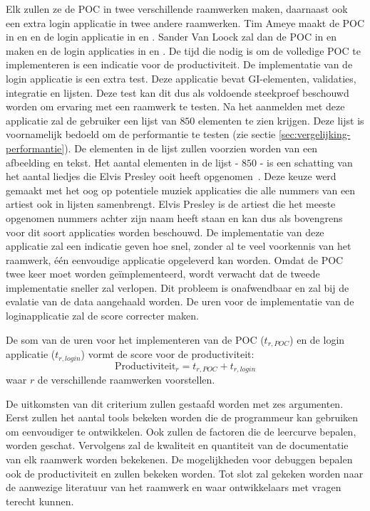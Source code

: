 Elk zullen ze de POC in twee verschillende raamwerken maken,  daarnaast ook een extra login applicatie in twee andere raamwerken.
Tim Ameye maakt de POC in \jqm{} en \lungo{} en de login applicatie in \st{} en \kendo{}.
Sander Van Loock zal dan de POC in \st{} en \kendo{} maken en de login applicaties in \jqm{} en \lungo{}.
De tijd die nodig is om de volledige POC te implementeren is een indicatie voor de productiviteit. 
De implementatie van de login applicatie is een extra test.
Deze applicatie bevat GI-elementen, validaties,   integratie en lijsten.
Deze test kan dit dus als voldoende steekproef beschouwd worden om ervaring met een raamwerk te testen.
Na het aanmelden met deze applicatie zal de gebruiker een lijst van $850$ elementen te zien krijgen.
Deze lijst is voornamelijk bedoeld om de performantie te testen (zie sectie \ref{sec:vergelijking-performantie}).
De elementen in de lijst zullen voorzien worden van een afbeelding en tekst.
Het aantal elementen in de lijst - $850$ - is een schatting van het aantal liedjes die Elvis Presley ooit heeft opgenomen~\cite{Zimmy2011}.
Deze keuze werd gemaakt met het oog op potentiele muziek applicaties die alle nummers van een artiest ook in lijsten samenbrengt.
Elvis Presley is de artiest die het meeste opgenomen nummers achter zijn naam heeft staan en kan dus als bovengrens voor dit soort applicaties worden beschouwd.
De implementatie van deze applicatie zal een indicatie geven hoe snel,  zonder al te veel voorkennis van het raamwerk,  één eenvoudige applicatie opgeleverd kan worden.
Omdat de POC twee keer moet worden geïmplementeerd, wordt verwacht dat de tweede implementatie sneller zal verlopen.
Dit probleem is onafwendbaar en zal bij de evalatie van de data aangehaald worden.
De uren voor de implementatie van de loginapplicatie zal de score correcter maken.

De som van de uren voor het implementeren van de POC ($t_{r,POC}$) en de login applicatie ($t_{r,login}$) vormt de score voor de productiviteit:
\begin{equation}
  \text{Productiviteit}_r = {t_{r,POC} + t_{r,login}}
  \label{eq:productiviteit}
\end{equation}
waar $r$ de verschillende raamwerken voorstellen.


De uitkomsten van dit criterium zullen gestaafd worden met zes argumenten.
Eerst zullen het aantal tools bekeken worden die de programmeur kan gebruiken om eenvoudiger te ontwikkelen.
Ook zullen de factoren die de leercurve bepalen, worden geschat.
Vervolgens zal de kwaliteit en quantiteit van de documentatie van elk raamwerk worden bekekenen.
De mogelijkheden voor debuggen bepalen ook de productiviteit en zullen bekeken worden.
Tot slot zal gekeken worden naar de aanwezige literatuur van het raamwerk en waar ontwikkelaars met vragen terecht kunnen.

